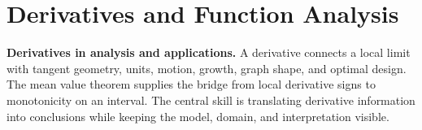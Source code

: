 \chapter{Derivatives and Function Analysis}










\noindent\textbf{Derivatives in analysis and applications.} A derivative connects a local limit with tangent geometry, units, motion, growth, graph shape, and optimal design. The mean value theorem supplies the bridge from local derivative signs to monotonicity on an interval. The central skill is translating derivative information into conclusions while keeping the model, domain, and interpretation visible.


